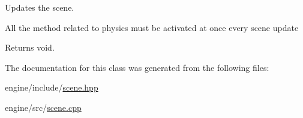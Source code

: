 Updates the scene. 

All the method related to physics must be activated at once every scene update

\begin{DoxyReturn}{Returns}
void. 
\end{DoxyReturn}


The documentation for this class was generated from the following files\+:\begin{DoxyCompactItemize}
\item 
engine/include/\hyperlink{scene_8hpp}{scene.\+hpp}\item 
engine/src/\hyperlink{scene_8cpp}{scene.\+cpp}\end{DoxyCompactItemize}
